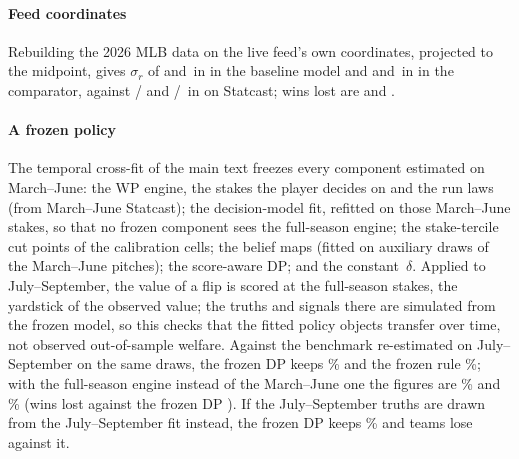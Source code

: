 \documentclass[aoas]{imsart}
\theoremstyle{plain}
\theoremstyle{definition}
\begin{document}
\paragraph{Feed coordinates} Rebuilding the 2026 MLB data on the live feed's own coordinates, projected to the
midpoint, gives $\sigma_r$ of \FeedBaseSrBatter{} and \FeedBaseSrCatcher\,in in the baseline model and \SFeedMainSrBatter{}
and \SFeedMainSrCatcher\,in in the comparator, against \SrBaseBatter{} / \SrBaseCatcher{} and \SrBatter{} /
\SrCatcher\,in on Statcast; wins lost are \SFeedLost{} and \SFeedLostMain.

\paragraph{A frozen policy} The temporal cross-fit of the main text freezes every component estimated on March--June:
the WP engine, the stakes the player decides on and the run laws (from March--June Statcast); the decision-model fit,
refitted on those March--June stakes, so that no frozen component sees the full-season engine; the stake-tercile cut
points of the calibration cells; the belief maps (fitted on auxiliary draws of the March--June pitches); the
score-aware DP; and the constant~$\delta$. Applied to July--September, the value of a flip is scored at the
full-season stakes, the yardstick of the observed value; the truths and signals there are simulated from the frozen
model, so this checks that the fitted policy objects transfer over time, not observed out-of-sample welfare. Against the benchmark re-estimated on July--September on
the same draws, the frozen DP keeps \FrozenDPShare\% and the frozen rule \FrozenRuleShareRetro\%; with the full-season
engine instead of the March--June one the figures are \FrozenDPShareNoEng\% and \FrozenRuleShareRetroNoEng\% (wins lost
against the frozen DP \FrozenLostNoEng). If the July--September truths are drawn from the July--September fit instead,
the frozen DP keeps \FrozenDPShareWorldTest\% and teams lose \FrozenLostWorldTest{} against it.
\end{document}
